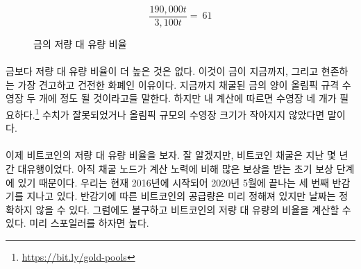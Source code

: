 \begin{figure}
	\centering
	\begin{equation}
		\frac{190,000 t}{3,100 t} = ~ 61
	\end{equation}
	\caption{금의 저량 대 유량 비율}
	\label{fig:stock-to-flow-gold}
\end{figure}

\paragraph{}
\begin{comment}	
	Nothing has a higher stock-to-flow ratio than gold. This is why gold, up to now,
	was the hardest, soundest money in existence. It is often said that all the gold
	mined so far would fit in two olympic-sized swimming pools. According to my
	calculations\footnote{\url{https://bit.ly/gold-pools}}, we would need four. So
	maybe this needs updating, or Olympic-sized swimming pools got smaller.
\end{comment}
금보다 저량 대 유량 비율이 더 높은 것은 없다. 
이것이 금이 지금까지, 그리고 현존하는 가장 견고하고 건전한 화폐인 이유이다. 
지금까지 채굴된 금의 양이 올림픽 규격 수영장 두 개에 정도 될 것이라고들 말한다.
하지만 내 계산에 따르면 수영장 네 개가 필요하다.\footnote{\url{https://bit.ly/gold-pools}}
수치가 잘못되었거나 올림픽 규모의 수영장 크기가 작아지지 않았다면 말이다.

\paragraph{}
\begin{comment}	
	Enter Bitcoin. As you probably know, bitcoin mining was all the rage in
	the last couple of years. This is because we are still in the early
	phases of what is called the \textit{reward era}, where mining nodes are
	rewarded with \textit{a lot} of bitcoin for their computational effort. We are
	currently in reward era number 3, which began in 2016 and will end in
	early 2020, probably in May. While the bitcoin supply is predetermined,
	the inner workings of Bitcoin only allow for approximate dates.
	Nevertheless, we can predict with certainty how high Bitcoin's
	stock-to-flow ratio will be. Spoiler alert: it will be high.
\end{comment}
이제 비트코인의 저량 대 유량 비율을 보자. 
잘 알겠지만, 비트코인 채굴은 지난 몇 년간 대유행이었다.
아직 채굴 노드가 계산 노력에 비해 많은 보상을 받는 초기 보상 단계에 있기 때문이다.
우리는 현재 2016년에 시작되어 2020년 5월에 끝나는 세 번째 반감기를 지나고 있다.
반감기에 따른 비트코인의 공급량은 미리 정해져 있지만 날짜는 정확하지 않을 수 있다.
그럼에도 불구하고 비트코인의 저량 대 유량의 비율을 계산할 수 있다.
미리 스포일러를 하자면 높다.


